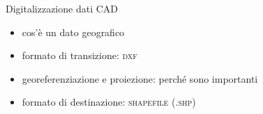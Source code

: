 \documentclass{beamer}
\begin{document}
            {
                \begin{frame}{Digitalizzazione dati CAD}
                    \colorbox{yellow!20}{
                        \begin{minipage}[t]{\paperwidth}
                            \begin{itemize}
                                \item cos'è un dato geografico
                                \item formato di transizione: \textsc{dxf}
                                \item georeferenziazione e proiezione: perché sono importanti
                                \item formato di destinazione: \textsc{shapefile} (\textsc{.shp})
                            \end{itemize}
                        \end{minipage}
                    }
                \end{frame}
            }
\end{document}
